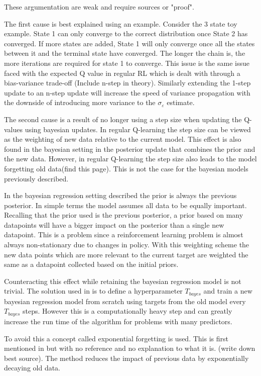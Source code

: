 \todo These argumentation are weak and require sources or "proof". 

The first cause is best explained using an example. Consider the 3 state toy example. State 1 can only converge to the correct distribution once State 2 has converged. If more states are added, State 1 will only converge once all the states between it and the terminal state have converged. The longer the chain is, the more iterations are required for state 1 to converge. This issue is the same issue faced with the expected Q value in regular RL which is dealt with through a bias-variance trade-off (\todo Include n-step in theory). Similarly extending the 1-step update to an n-step update will increase the speed of variance propagation with the downside of introducing more variance to the $\sigma_\varepsilon$ estimate.

The second cause is a result of no longer using a step size when updating the Q-values using bayesian updates. In regular Q-learning the step size can be viewed as the weighting of new data relative to the current model. This effect is also found in the bayesian setting in the posterior update that combines the prior and the new data. However, in regular Q-learning the step size also leads to the model forgetting old data(\cite{sutton_barto_2018}\todo find this page). This is not the case for the bayesian models previously described.

In the bayesian regression setting described the prior is always the previous posterior. In simple terms the model assumes all data to be equally important. Recalling that the prior used is the previous posterior, a prior based on many datapoints will have a bigger impact on the posterior than a single new datapoint. This is a problem since a reinforcement learning problem is almost always non-stationary due to changes in policy. With this weighting scheme the new data points which are more relevant to the current target are weighted the same as a datapoint collected based on the initial priors.

Counteracting this effect while retaining the bayesian regression model is not trivial. The solution used in \cite{azziz_2018} is to define a hyperparameter $T_{bayes}$ and train a new bayesian regression model from scratch using targets from the old model every $T_{bayes}$ steps. However this is a computationally heavy step and can greatly increase the run time of the algorithm for problems with many predictors. 

To avoid this a concept called exponential forgetting is used. This is first mentioned in \cite{dearden_1998} but with no reference and no explanation to what it is. (\todo write down best source). The method reduces the impact of previous data by exponentially decaying old data.

